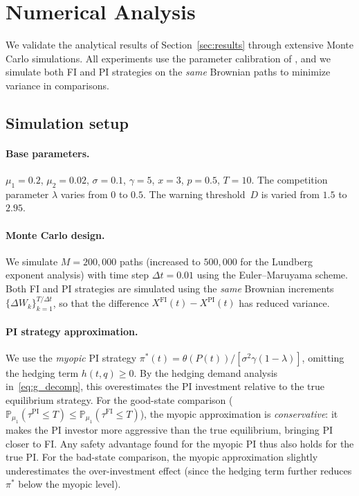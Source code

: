 \documentclass[12pt]{article}
\theoremstyle{remark}
\theoremstyle{definition}
\newcommand{\Prob}{\mathbb{P}}
\newcommand{\FI}{\mathrm{FI}}
\newcommand{\PI}{\mathrm{PI}}
\begin{document}
\section{Numerical Analysis}\label{sec:numerics_v2}

We validate the analytical results of Section~\ref{sec:results} through
extensive Monte Carlo simulations.
All experiments use the parameter calibration of
\citet[Figure~4]{HuangSun2025}, and we simulate both FI and PI strategies
on the \emph{same} Brownian paths to minimize variance in comparisons.

\subsection{Simulation setup}\label{sec:sim_setup}

\paragraph{Base parameters.}
$\mu_1 = 0.2$, $\mu_2 = 0.02$, $\sigma = 0.1$, $\gamma = 5$,
$x = 3$, $p = 0.5$, $T = 10$.
The competition parameter $\lambda$ varies from $0$ to $0.5$.
The warning threshold~$D$ is varied from $1.5$ to $2.95$.

\paragraph{Monte Carlo design.}
We simulate $M = 200{,}000$ paths (increased to $500{,}000$ for
the Lundberg exponent analysis) with time step $\Delta t = 0.01$
using the Euler--Maruyama scheme.
Both FI and PI strategies are simulated using the \emph{same}
Brownian increments $\{\Delta W_k\}_{k=1}^{T/\Delta t}$,
so that the difference $X^{\FI}(t) - X^{\PI}(t)$ has reduced variance.

\paragraph{PI strategy approximation.}
We use the \emph{myopic} PI strategy
$\pi^*(t) = \theta(P(t))/[\sigma^2\gamma(1-\lambda)]$,
omitting the hedging term $h(t,q) \ge 0$.
By the hedging demand analysis in~\eqref{eq:g_decomp}, this overestimates the PI investment
relative to the true equilibrium strategy.
For the good-state comparison
($\Prob_{\mu_1}(\tau^{\PI} \le T) \le \Prob_{\mu_1}(\tau^{\FI} \le T)$),
the myopic approximation is \emph{conservative}: it makes the PI
investor more aggressive than the true equilibrium, bringing PI
closer to FI.
Any safety advantage found for the myopic PI thus also holds for
the true PI.
For the bad-state comparison, the myopic approximation slightly
underestimates the over-investment effect (since the hedging
term further reduces $\pi^*$ below the myopic level).
\end{document}
